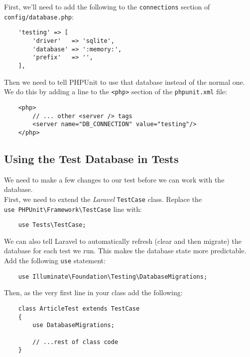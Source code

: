 First, we'll need to add the following to the \texttt{connections} section of \\ \texttt{config/database.php}:

\begin{verbatim}
    'testing' => [
        'driver'   => 'sqlite',
        'database' => ':memory:',
        'prefix'   => '',
    ],
\end{verbatim}

Then we need to tell PHPUnit to use that database instead of the normal one. We do this by adding a line to the \texttt{<php>} section of the \texttt{phpunit.xml} file:

\begin{verbatim}
    <php>
        // ... other <server /> tags
        <server name="DB_CONNECTION" value="testing"/>
    </php>
\end{verbatim}


\subsection{Using the Test Database in Tests}

We need to make a few changes to our test before we can work with the database.
\\

First, we need to extend the \textit{Laravel} \texttt{TestCase} class. Replace the \\ \texttt{use PHPUnit\textbackslash{}Framework\textbackslash{}TestCase} line with:

\begin{verbatim}
    use Tests\TestCase;
\end{verbatim}

We can also tell Laravel to automatically refresh (clear and then migrate) the database for each test we run. This makes the database state more predictable.
\\

Add the following \texttt{use} statement:

\begin{verbatim}
    use Illuminate\Foundation\Testing\DatabaseMigrations;
\end{verbatim}

Then, as the very first line in your class add the following:

\begin{verbatim}
    class ArticleTest extends TestCase
    {
        use DatabaseMigrations;

        // ...rest of class code
    }
\end{verbatim}

